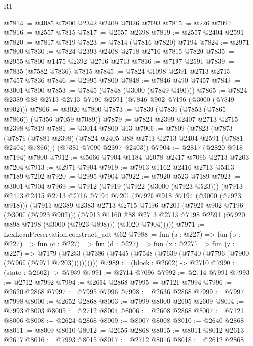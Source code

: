 \begin{lexlean}{R1}
\begin{coremodule}
@7814 := @4085 @7800 @2342 @2409 @7026 @7093
@7815 := @226 @7090
@7816 := @2557 @7815
@7817 := @2557 @2398
@7819 := @2557 @2404 @2591
@7820 := @7817 @7819
@7823 := @7814 (@7816 @7820) @7194
@7824 := @2971 @7800
@7830 := @7824 @2393 @2408 @2718 @2716 @7815 @7820
@7835 := @2955 @7800 @1475 @2392 @2716 @2713
@7836 := @7197 @2591
@7839 := @7835 (@7582 @7836) @7815
@7845 := @7824 @1098 @2391 @2713 @2715 @7457 @7836
@7846 := @2995 @7800
@7848 := @7846 @490 @7457
@7849 := @3001 @7800
@7853 := @7845 (@7848 (@3000 (@7849 @490)))
@7865 := @7824 @2389 @88 @2713 @2713 @7196 @2591 (@7846 @902 @7196 (@3000 (@7849 @902)))
@7866 := @3020 @7800
@7873 := @7830 (@7839 (@7853 (@7865 @7866)) (@7356 @7059 @7089))
@7879 := @7824 @2399 @2407 @2713 @2715 @2398 @7819
@7881 := @3014 @7800 @13
@7900 := @7809
    (@7823
      (@7873 (@7879 (@7881 @2398) (@7824 @2405 @88 @2713 @2713 @2404 @2591 (@7881 @2404) @7866)))
      (@7381 @7090 @2397 @2403))
@7904 := @2817 (@2820 @918 @7194) @7800
@7912 := @5666 @7904 @1184 @2078 @2417 @7096 @2713 @7203 @7204
@7913 := @2971 @7904
@7919 := @7913 @1162 @2416 @2713 @5413 @7189 @7202
@7920 := @2995 @7904
@7922 := @7920 @523 @7189
@7923 := @3001 @7904
@7969 := @7912
    (@7919
      (@7922 (@3000 (@7923 @523)))
      (@7913
        @2413
        @2415
        @2713
        @2716
        @7194
        @7201
        (@7920 @918 @7194 (@3000 (@7923 @918)))
        (@7913
          @2389
          @2383
          @2713
          @2715
          @7196
          @7200
          (@7920 @902 @7196 (@3000 (@7923 @902)))
          (@7913
            @1160
            @88
            @2713
            @2713
            @7198
            @2591
            (@7920 @898 @7198 (@3000 (@7923 @898)))
            (@3020 @7904)))))
@7971 := LexLeanPreservation.construct_adt @62
@7988 := fun (a : @227) =>
  fun (b : @227) =>
  fun (c : @227) =>
  fun (d : @227) =>
  fun (x : @227) =>
  fun (y : @227) =>
  @7179 (@7283 (@7386 (@7445 (@7548 (@7639 (@7740 (@7796 (@7900 (@7969 (@7971 @7203))))))))))
@7989 := (block : @2602) -> @2710
@7990 := (state : @2602) -> @7989
@7991 := @2714 @7096
@7992 := @2714 @7991
@7993 := @2712 @7992
@7994 := @2604 @2868
@7995 := @7121 @7994
@7996 := @2620 @2868
@7997 := @7995 @7996
@7998 := @2636 @2868
@7999 := @7997 @7998
@8000 := @2652 @2868
@8003 := @7999 @8000 @2605 @2609
@8004 := @7993 @8003
@8005 := @2712 @8004
@8006 := @2608 @2868
@8007 := @7121 @8006
@8008 := @2624 @2868
@8009 := @8007 @8008
@8010 := @2640 @2868
@8011 := @8009 @8010
@8012 := @2656 @2868
@8015 := @8011 @8012 @2613 @2617
@8016 := @7993 @8015
@8017 := @2712 @8016
@8018 := @2612 @2868

\end{coremodule}
\end{lexlean}
